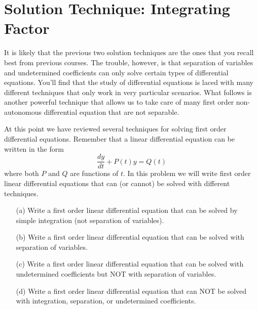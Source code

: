 \section{Solution Technique: Integrating Factor}
It is likely that the previous two solution techniques are the ones that you recall best
from previous courses.  The trouble, however, is that separation of variables and
undetermined coefficients can only solve certain types of differential equations.  You'll
find that the study of differential equations is laced with many different techniques that
only work in very particular scenarios.  What follows is another powerful technique that
allows us to take care of many first order non-autonomous differential equation that are
not separable.  
\begin{problem}
    At this point we have reviewed several techniques for solving first order differential
    equations.  Remember that a linear differential equation can be written in the form
    \[ \frac{dy}{dt} + P(t) y = Q(t) \]
    where both $P$ and $Q$ are functions of $t$. In this problem we will write first order
    linear differential equations that can (or cannot) be solved with different
    techniques.
    \begin{enumerate}
        \item[(a)] Write a first order linear differential equation that can be solved
            by simple integration (not separation of variables).  
        \item[(b)] Write a first order linear differential equation that can be solved
            with separation of variables.
        \item[(c)] Write a first order linear differential equation that can be solved
            with undetermined coefficients but NOT with separation of variables.
        \item[(d)] Write a first order linear differential equation that can NOT be
            solved with integration, separation, or undetermined coefficients.
    \end{enumerate}
\end{problem}

